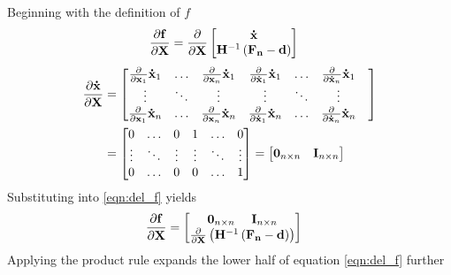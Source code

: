 \chapter{\uppercase{\algname{}}} \label{chap:differential_kinematics}
Beginning with the definition of $f$
\begin{align} \label{eqn:del_f}
    \frac{\partial\mathbf{f}}{\partial \mathbf{X}} &= \frac{\partial}{\partial \mathbf{X}}
    \begin{bmatrix}
    {\mathbf{\dot{x}}} \\
    {\mathbf{H}}^{-1}\left ({\mathbf{F_n}} - {\mathbf{d}} \right )
    \end{bmatrix} 
\end{align}
\begin{align*}
    \frac{\partial{\mathbf{\dot{x}}}}{\partial \mathbf{X}}  &= 
    \begin{bmatrix}
    \frac{\partial}{\partial {\mathbf{{x}}}_1}{\mathbf{\dot{x}}}_1 &  \hdots & \frac{\partial}{\partial {\mathbf{{x}}}_n}{\mathbf{\dot{x}}}_1 & \frac{\partial}{\partial {\mathbf{\dot{x}}}_1}{\mathbf{\dot{x}}}_1 & \hdots & \frac{\partial}{\partial {\mathbf{\dot{x}}}_n}{\mathbf{\dot{x}}}_1\\
    \vdots & \ddots & \vdots & \vdots & \ddots & \vdots  & \\
    \frac{\partial}{\partial {\mathbf{{x}}}_1}{\mathbf{\dot{x}}}_n & \hdots & \frac{\partial}{\partial {\mathbf{{x}}}_n}{\mathbf{\dot{x}}}_n  & \frac{\partial}{\partial {\mathbf{\dot{x}}}_1}{\mathbf{\dot{x}}}_n   & \hdots & \frac{\partial}{\partial {\mathbf{\dot{x}}}_n}{\mathbf{\dot{x}}}_n\\
    \end{bmatrix} \\ &=
    \begin{bmatrix}
    0 & \hdots & 0 & 1 & \hdots & 0\\
    \vdots & \ddots & \vdots & \vdots & \ddots & \vdots\\
    0 & \hdots & 0 & 0 & \hdots & 1 \\
    \end{bmatrix} = 
    \begin{bmatrix}
    {\mathbf{0}}_{n \times n} & {\mathbf{I}}_{n \times n}
    \end{bmatrix}
\end{align*}
\noindent Substituting into \ref{eqn:del_f} yields 
\begin{align} \label{del_f_2}
    \frac{\partial\mathbf{f}}{\partial\mathbf{X}} &= 
    \begin{bmatrix}
    {\mathbf{0}}_{n \times n}  ~~~~ {\mathbf{I}}_{n \times n}  \\
    \frac{\partial}{\partial \mathbf{X}} \left ({\mathbf{H}}^{-1}\left ({\mathbf{F_n}} - {\mathbf{d}} \right ) \right ) 
    \end{bmatrix}
\end{align}
\noindent Applying the product rule expands the lower half of equation \ref{eqn:del_f} further
